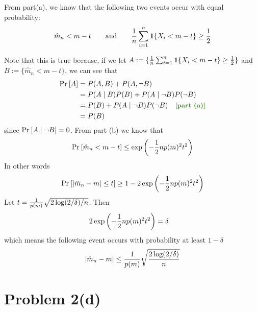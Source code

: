 \documentclass[11pt]{article}
\newcommand{\1}{\mathbb{I}} %
\begin{document}
From part(a), we know that the following two events occur with equal probability:
\begin{align}
	\hat m_n < m - t 
	\qquad \text{and} \qquad
	\frac{1}{n} \sum_{i=1}^{n} \mathbf{1}\{  X_i < m - t \} \geq \frac{1}{2}
\end{align}

Note that this is true because, if we let $A := \{ \frac{1}{n} \sum_{i=1}^{n} \mathbf{1}\{  X_i < m - t \} \geq \frac{1}{2} \}$ and $B:=\{  \hat m_n < m - t   \}$, we can see that
\begin{align}
	\Prob{A}
		&= P(A, B) + P(A, \lnot B) \\
		&= P(A \mid B) P(B) + P(A \mid \lnot B) P(\lnot B) \\
		&= P(B)+ P(A \mid \lnot B) P(\lnot B) \quad \mtgreen{[part (a)]} \\
		&= P(B) 
\end{align}
since $\text{Pr}_{}\left[A \mid \lnot B\right] = 0$. From part (b) we know that
\begin{align}
	\text{Pr}_{}\left[ \hat m_n < m -t  \right] \leq \exp\left( - \frac{1}{2} n p(m)^2 t^2 \right)
\end{align}
In other words
\begin{align}
	\text{Pr}_{}\left[ |\hat m_n - m| \leq t\right] \geq 1 - 2 \exp\left( - \frac{1}{2} n p(m)^2 t^2 \right)
\end{align}
Let $t = \frac{1}{p(m)} \sqrt{2 \log(2/\delta) / n}$. Then
\begin{align}
	2 \exp\left( - \frac{1}{2} n p(m)^2 t^2 \right) 
		&= \delta 
\end{align}
which means the following event occurs with probability at least $1 - \delta$
\begin{align}
		|\hat m_n - m |
	\leq \frac{1}{p(m)} \sqrt{   \frac{2 \log(2 / \delta)}{n}}
\end{align}





 



\clearpage 
\section*{Problem 2(d)}
\end{document}
